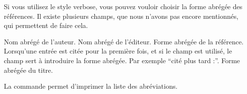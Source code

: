 Si vous utilisez le style verbose, vous pouvez vouloir choisir la forme abrégée des références. Il existe plusieurs champs, que nous n'avons pas encore mentionnés, qui permettent de faire cela.

\begin{fieldlist}
     Nom abrégé de l'auteur.
     Nom abrégé de l'éditeur.
     Forme abrégée de la référence.
     Lorsqu'une entrée est citée pour la première fois, et si le champ  est utilisé, le champ  sert à introduire la forme abrégée. Par exemple \enquote{cité plus tard :}.
     Forme abrégée du titre.
\end{fieldlist}

La commande  permet d'imprimer la liste des abréviations.

